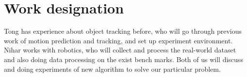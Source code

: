 \documentclass{article}
\begin{document}
\section{Work designation}
Tong has experience about object tracking before, who will go through previous work of motion prediction and tracking, and set up experiment environment. Nihar works with robotics, who will collect and process the real-world dataset and also doing data processing on the exist bench marks. Both of us will discuss and doing experiments of new algorithm to solve our particular problem. 


\end{document}
